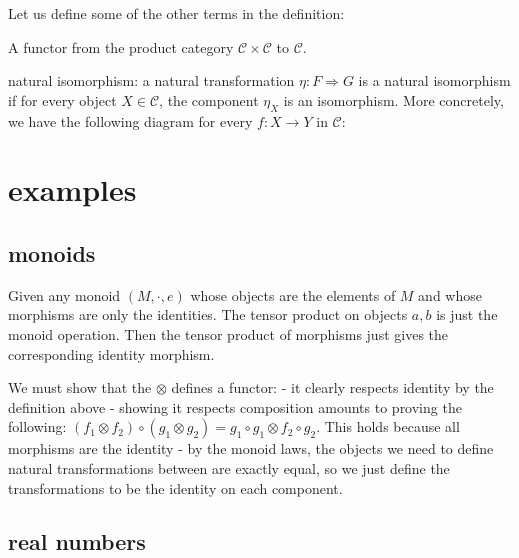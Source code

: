 Let us define some of the other terms in the definition:

\begin{definition}[bifunctor]
A functor from the product category \(\mathcal{C} \times \mathcal{C}\) 
to \(\mathcal{C}\).
\end{definition}

\begin{definition}
natural isomorphism: a natural transformation \(\eta : F \Rightarrow G\)
is a natural isomorphism if for every object \(X \in \mathcal{C}\), the
component \(\eta_X\) is an isomorphism. More concretely, we have the
following diagram for every $f : X \to Y$ in $\mathcal{C}$:

\end{definition}


\section{examples}

\subsection{monoids}

Given any monoid \((M, \cdot, e)\) whose objects are the elements of
\(M\) and whose morphisms are only the identities. The tensor product on
objects \(a, b\) is just the monoid operation. Then the tensor product
of morphisms just gives the corresponding identity morphism.

We must show that the \(\otimes\) defines a functor: - it clearly
respects identity by the definition above - showing it respects
composition amounts to proving the following:
\((f_1 \otimes f_2) \circ (g_1 \otimes g_2) =  g_1 \circ g_1 \otimes f_2 \circ g_2\).
This holds because all morphisms are the identity - by the monoid laws,
the objects we need to define natural transformations between are
exactly equal, so we just define the transformations to be the identity
on each component.

\hypertarget{real-numbers}{%
\subsection{real numbers}\label{real-numbers}}

